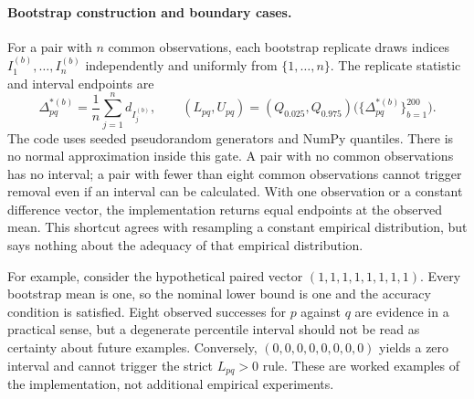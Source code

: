 \paragraph{Bootstrap construction and boundary cases.}
For a pair with $n$ common observations, each bootstrap replicate draws indices
$I_1^{(b)},\ldots,I_n^{(b)}$ independently and uniformly from $\{1,\ldots,n\}$.
The replicate statistic and interval endpoints are
\begin{equation}
 \Delta^{*(b)}_{pq}=\frac{1}{n}\sum_{j=1}^{n}d_{I_j^{(b)}},\qquad
 (L_{pq},U_{pq})=(Q_{0.025},Q_{0.975})
       \bigl(\{\Delta^{*(b)}_{pq}\}_{b=1}^{200}\bigr).
 \label{eq:bootstrap}
\end{equation}
The code uses seeded pseudorandom generators and NumPy quantiles. There is no
normal approximation inside this gate. A pair with no common observations has
no interval; a pair with fewer than eight common observations cannot trigger
removal even if an interval can be calculated. With one observation or a constant
difference vector, the implementation returns equal endpoints at the observed
mean. This shortcut agrees with resampling a constant empirical distribution,
but says nothing about the adequacy of that empirical distribution.

For example, consider the hypothetical paired vector $(1,1,1,1,1,1,1,1)$.
Every bootstrap mean is one, so the nominal lower bound is one and the accuracy
condition is satisfied. Eight observed successes for $p$ against $q$ are evidence
in a practical sense, but a degenerate percentile interval should not be read as
certainty about future examples. Conversely, $(0,0,0,0,0,0,0,0)$ yields a zero
interval and cannot trigger the strict $L_{pq}>0$ rule. These are worked examples
of the implementation, not additional empirical experiments.
